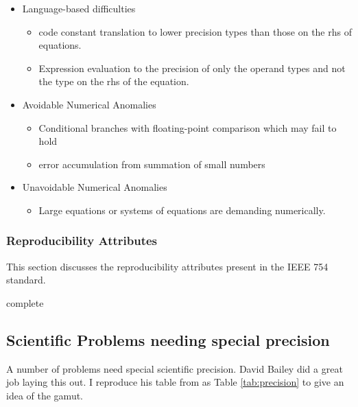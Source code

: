 \documentclass[american]{article}
\newcommand{\complete}{
	\gls{complete}
}
\begin{document}
\begin{itemize}
\item Language-based difficulties
\begin{itemize}
\item code constant translation to lower precision types than those on the rhs of equations.
\item Expression evaluation to the precision of only the operand types and not the type on the rhs of the equation.
\end{itemize}
\item Avoidable Numerical Anomalies
\begin{itemize}
\item Conditional branches with floating-point comparison which may fail to hold
\item error accumulation from summation of small numbers
\end{itemize}
\item Unavoidable Numerical Anomalies
\begin{itemize}
\item Large equations or systems of equations are demanding numerically.
\end{itemize}
\end{itemize}

\subsubsection{Reproducibility Attributes} \label{sec:precision-ieee-attributes}

This section discusses the reproducibility attributes present in the IEEE 754 standard. \cite{ieee-754-2008}

\complete

\subsection{Scientific Problems needing special precision} \label{sec:precision-special}

A number of problems need special scientific precision. David Bailey did a great job laying this out\cite{high-precision-arith-in-science,dhb-zurich-hp}. I reproduce his table from \cite{dhb-zurich-hp} as Table \ref{tab:precision} to give an idea of the gamut.
\end{document}
